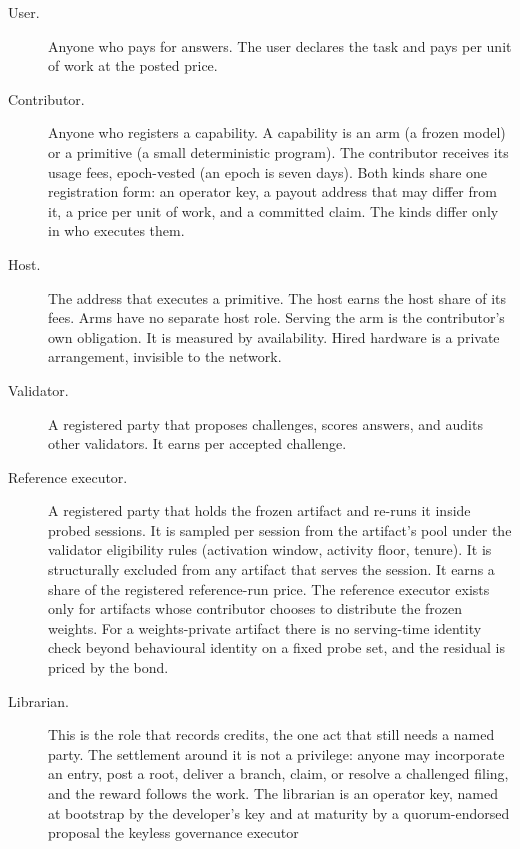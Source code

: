 \documentclass[11pt]{article}
\begin{document}
\begin{description}
    \item[User.] Anyone who pays for answers. The user declares the
          task and pays per unit of work at the posted price.
    \item[Contributor.] Anyone who registers a capability. A
          capability is an arm (a frozen model) or a primitive (a small
          deterministic program). The contributor receives its usage fees,
          epoch-vested (an epoch is seven days). Both kinds share one
          registration form: an operator
          key, a payout address that may differ from it, a price per unit
          of work, and a committed claim. The kinds differ only in who
          executes them.
    \item[Host.] The address that executes a primitive. The host
          earns the host share of its fees. Arms have no separate host
          role. Serving the arm is the contributor's own obligation. It is
          measured by availability. Hired hardware is a private
          arrangement, invisible to the network.
    \item[Validator.] A registered party that proposes challenges,
          scores answers, and audits other validators. It earns per
          accepted challenge.
    \item[Reference executor.] A registered party that holds the
          frozen artifact and re-runs it inside probed sessions. It is
          sampled per session from the artifact's pool under the validator
          eligibility rules (activation window, activity floor, tenure). It
          is structurally excluded from any artifact that serves the
          session. It earns a share of the registered reference-run price.
          The reference executor exists only for artifacts whose
          contributor chooses to distribute the frozen weights. For a
          weights-private artifact there is no serving-time identity check
          beyond behavioural identity on a fixed probe set, and the
          residual is priced by the bond.
    \item[Librarian.] This is the role that records credits, the one
          act that still needs a named party. The settlement around it is
          not a privilege: anyone may incorporate an entry, post a root,
          deliver a branch, claim, or resolve a challenged filing, and the
          reward follows the work. The librarian is an operator
          key, named at bootstrap by the developer's key and at maturity
          by a quorum-endorsed proposal the keyless governance executor

\end{description}
\end{document}
